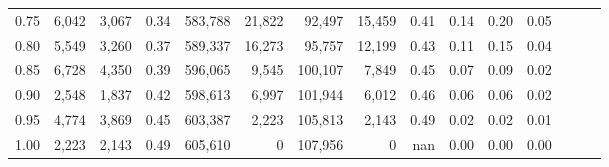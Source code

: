 \begin{tabular}{rrrrrrrrrrrrrrr}
0.75 &   6,042 &   3,067 &  0.34 &  583,788 &   21,822 &   92,497 &   15,459 &  0.41 &  0.14 &  0.20 &      0.05 \\
0.80 &   5,549 &   3,260 &  0.37 &  589,337 &   16,273 &   95,757 &   12,199 &  0.43 &  0.11 &  0.15 &      0.04 \\
0.85 &   6,728 &   4,350 &  0.39 &  596,065 &    9,545 &  100,107 &    7,849 &  0.45 &  0.07 &  0.09 &      0.02 \\
0.90 &   2,548 &   1,837 &  0.42 &  598,613 &    6,997 &  101,944 &    6,012 &  0.46 &  0.06 &  0.06 &      0.02 \\
0.95 &   4,774 &   3,869 &  0.45 &  603,387 &    2,223 &  105,813 &    2,143 &  0.49 &  0.02 &  0.02 &      0.01 \\
1.00 &   2,223 &   2,143 &  0.49 &  605,610 &        0 &  107,956 &        0 &   nan &  0.00 &  0.00 &      0.00 \\
\bottomrule
\end{tabular}
